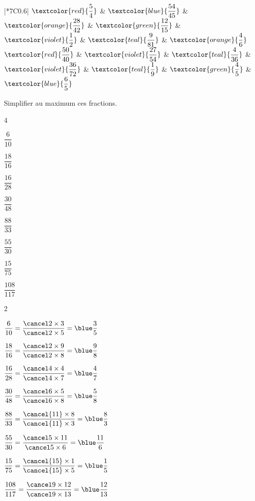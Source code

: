 \begin{colonne*exercice}
\begin{corrige}
   \ \\ [-8mm]
   {
   \begin{tabular}[t]{|*{7}{C{0.6}}|}
      \hline
      $\textcolor{red}{\dfrac{5}{4}}$ & $\textcolor{blue}{\dfrac{54}{45}}$ & $\textcolor{orange}{\dfrac{28}{42}}$ & $\textcolor{green}{\dfrac{12}{15}}$ & $\textcolor{violet}{\dfrac{1}{2}}$ & $\textcolor{teal}{\dfrac{9}{81}}$ & $\textcolor{orange}{\dfrac{4}{6}}$ \\
       $\textcolor{red}{\dfrac{50}{40}}$ & $\textcolor{violet}{\dfrac{27}{54}}$ & $\textcolor{teal}{\dfrac{4}{36}}$ & $\textcolor{violet}{\dfrac{36}{72}}$ & $\textcolor{teal}{\dfrac{1}{9}}$ & $\textcolor{green}{\dfrac{4}{5}}$ & $\textcolor{blue}{\dfrac{6}{5}}$ \\ [1mm]
      \hline
   \end{tabular}}
\end{corrige}

\medskip

\begin{exercice} %
   Simplifier au maximum ces fractions. \medskip
   \begin{colenumerate}{4}
      \item $\dfrac{6}{10}$ \bigskip
      \item $\dfrac{18}{16}$ \bigskip
      \item $\dfrac{16}{28}$
      \item $\dfrac{30}{48}$
      \item $\dfrac{88}{33}$
      \item $\dfrac{55}{30}$
      \item $\dfrac{15}{75}$
      \item $\dfrac{108}{117}$
   \end{colenumerate}
\end{exercice}

\begin{corrige}
   \begin{colenumerate}{2}
      \item $\dfrac{6}{10} =\dfrac{\cancel2\times3}{\cancel2\times5} =\blue\dfrac35$ \medskip
      \item $\dfrac{18}{16} =\dfrac{\cancel2\times9}{\cancel2\times8} =\blue\dfrac98$ \medskip
      \item $\dfrac{16}{28} =\dfrac{\cancel4\times4}{\cancel4\times7} =\blue\dfrac47$ \medskip
      \item $\dfrac{30}{48} =\dfrac{\cancel6\times5}{\cancel6\times8} =\blue\dfrac58$ \medskip
      \item $\dfrac{88}{33} =\dfrac{\cancel{11}\times8}{\cancel{11}\times3} =\blue\dfrac83$ \medskip
      \item $\dfrac{55}{30} =\dfrac{\cancel5\times11}{\cancel5\times6} =\blue\dfrac{11}6$ \medskip
      \item $\dfrac{15}{75} =\dfrac{\cancel{15}\times1}{\cancel{15}\times5} =\blue\dfrac15$ \medskip
      \item $\dfrac{108}{117} =\dfrac{\cancel9\times12}{\cancel9\times13} =\blue\dfrac{12}{13}$
   \end{colenumerate}
\end{corrige}


\end{colonne*exercice}
